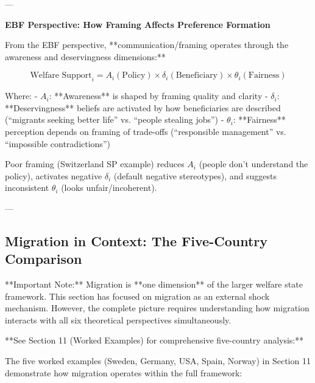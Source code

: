 ---

\textbf{EBF Perspective: How Framing Affects Preference Formation}

From the EBF perspective, **communication/framing operates through the awareness and deservingness dimensions:**

\begin{equation}
\text{Welfare Support}_i = A_i(\text{Policy}) \times \delta_i(\text{Beneficiary}) \times \theta_i(\text{Fairness})
\end{equation}

Where:
- $A_i$: **Awareness** is shaped by framing quality and clarity
- $\delta_i$: **Deservingness** beliefs are activated by how beneficiaries are described (``migrants seeking better life'' vs. ``people stealing jobs'')
- $\theta_i$: **Fairness** perception depends on framing of trade-offs (``responsible management'' vs. ``impossible contradictions'')

Poor framing (Switzerland SP example) reduces $A_i$ (people don't understand the policy), activates negative $\delta_i$ (default negative stereotypes), and suggests inconsistent $\theta_i$ (looks unfair/incoherent).

---

\subsection{Migration in Context: The Five-Country Comparison}

**Important Note:** Migration is **one dimension** of the larger welfare state framework. This section has focused on migration as an external shock mechanism. However, the complete picture requires understanding how migration interacts with all six theoretical perspectives simultaneously.

**See Section 11 (Worked Examples) for comprehensive five-country analysis:**

The five worked examples (Sweden, Germany, USA, Spain, Norway) in Section 11 demonstrate how migration operates within the full framework:


